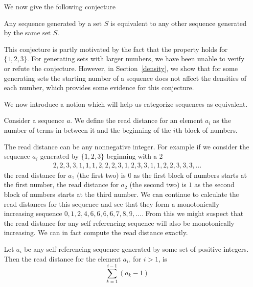 \documentclass[runningheads,a4paper]{llncs}
\begin{document}
We now give the following conjecture

\begin{conjecture} Any sequence generated by a set $S$ is equivalent to any other sequence generated by the same set $S$.
\end{conjecture}

This conjecture is partly motivated by the fact that the property holds for $\{1,2,3\}$. For generating sets with larger numbers, we have been unable to verify or refute the conjecture. However, in Section~\ref{density}, we show that for some generating sets the starting number of a sequence does not affect the densities of each number, which provides some evidence for this conjecture.

We now introduce a notion which will help us categorize sequences as equivalent. 
\begin{definition} Consider a sequence $a$. We define the read distance for an element $a_i$ as the number of terms in between it and the beginning of the $i$th block of numbers.
\end{definition}
The read distance can be any nonnegative integer. For example if we consider the sequence $a_i$ generated by $\{1,2,3\}$ beginning with a 2  
\begin{align*}
2,2,3,3,1,1,1,2,2,2,3,1,2,3,3,1,1,2,2,3,3,3,\dots
\end{align*}
the read distance for $a_1$ (the first two) is $0$ as the first block of numbers starts at the first number, the read distance for $a_2$ (the second two) is $1$ as the second block of numbers starts at the third number. We can continue to calculate the read distances for this sequence and see that they form a monotonically increasing sequence $0,1,2,4,6,6,6,6,7,8,9,\ldots$. From this we might suspect that the read distance for any self referencing sequence will also be monotonically increasing. We can in fact compute the read distance exactly. 
\begin{lemma} 
\label{readdistformula}
Let $a_i$ be any self referencing sequence generated by some set of positive integers. Then the read distance for the element $a_i$, for $i>1$, is 
\begin{equation*}
\sum_{k=1}^{i-1}( a_k - 1)
\end{equation*} 
\end{lemma}
\end{document}
